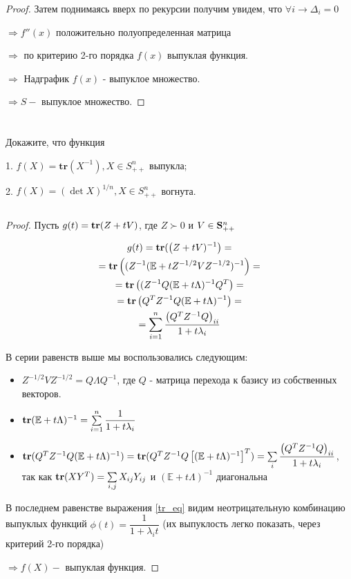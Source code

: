 \documentclass[a4paper,12pt]{article}
\newcommand{\lt}{\left}
\newcommand{\rt}{\right}
\newcommand{\fr}{\frac}
\newcommand{\dfr}{\dfrac}
\newcommand{\bb}{\mathbb}
\newcommand{\La}{\Lambda}
\newcommand{\la}{\lambda}
\begin{document}
\begin{proof}
Затем поднимаясь вверх по рекурсии получим увидем, что $\forall i \rightarrow \Delta_i = 0$

\vspace{\baselineskip}

$\Rightarrow f''(x) $ положительно полуопределенная матрица  

$\Rightarrow $ по критерию 2-го порядка $f(x)$ выпуклая функция.

$\Rightarrow $ Надграфик $f(x)$ - выпуклое множество.

$\Rightarrow S - $ выпуклое множество.

\end{proof}

\section{}

Докажите, что функция 

1. $f(X) = \mathbf{tr}(X^{-1}), X \in S^n_{++}$ выпукла;

2. $f(X) = (\det X)^{1/n}, X \in S^n_{++}$ вогнута.

\subsection{}
\begin{proof}
Пусть $g(t) =  {\bf tr}(Z + tV)$, где  $Z\succ 0$ и $V \in {\bf S}^n_{++} $

\begin{multline}\label{tr_eq}
g(t) = {\bf tr}(\lt(Z + tV)^{-1}\rt) 
=\\= 
{\bf tr}\lt((Z^{-1}(\bb E + tZ^{-1/2} V Z^{-1/2})^{-1}\rt) 
=\\= 
{\bf tr}\lt((Z^{-1}Q(\bb E + t\La)^{-1}Q^T\rt)
=\\= 
{\bf tr}\lt(Q^TZ^{-1}Q(\bb E + t\La)^{-1}\rt)
=\\=
\sum \limits_{i=1}^{n} \fr{\lt(Q^TZ^{-1}Q \rt)_{ii}}{1 + t\lambda_i}
\end{multline}

В серии равенств выше мы воспользовались следующим:

\begin{itemize} 
	\item $Z^{-1/2}VZ^{-1/2} = Q\La Q^{-1} $, где $Q$ - матрица перехода к базису из собственных векторов.
	\item ${\bf tr}( \bb E + t\La)^{-1} = \sum \limits_{i=1}^{n}\dfr{1}{1 + t\lambda_i}$
	\item ${\bf tr}(Q^TZ^{-1}Q( \bb E + t\La)^{-1}) = {\bf tr}(Q^TZ^{-1}Q\lt[( \bb E + t\La)^{-1}\rt]^T) = \sum\limits_{i}\dfr{\lt(Q^TZ^{-1}Q \rt)_{ii}}{1 + t\lambda_i}$, так как ${\bf tr}(XY^T) = \sum\limits_{i,j}X_{ij}Y_{ij}$  и  $\lt(\bb E + t\La\rt)^{-1}$ диагональна
\end{itemize}	

В последнем равенстве выражения \eqref{tr_eq} видим неотрицательную комбинацию выпуклых функций $\phi(t) = \dfr{1}{1 + \la_i t}$ (их выпуклость легко показать, через критерий 2-го порядка)

$\Rightarrow f(X) - $ выпуклая функция.
\end{proof}	
	
\end{document}
